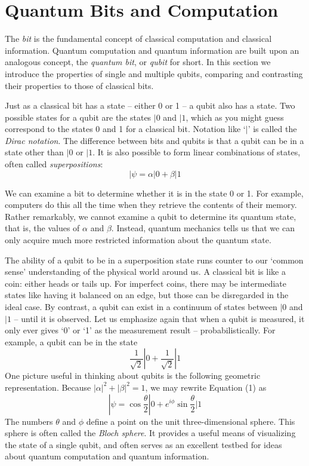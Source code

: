 \documentclass[20pt]{report}
\begin{document}
\part{Quantum Bits and Computation}
The \textit{bit} is the fundamental concept of classical computation and classical information.
Quantum computation and quantum information are built upon an analogous concept,
the \textit{quantum bit}, or \textit{qubit} for short. In this section we introduce the properties of single
and multiple qubits, comparing and contrasting their properties to those of classical bits.
\par
Just as a classical bit has a state – either 0 or 1 – a qubit also
has a state. Two possible states for a qubit are the states $|0$ and $|1$, which as you might
guess correspond to the states 0 and 1 for a classical bit. Notation like ‘$| $’ is called the
\textit{Dirac notation}.  The difference between bits and qubits is that a qubit can be in a
state other than $|0 $ or $|1 $. It is also possible to form linear combinations of states, often
called \textit{superpositions}: 
\begin{equation}
|\psi = \alpha|0 + \beta|1
\end{equation}
\par
We can examine a bit to determine whether it is in the state 0 or 1. For example,
computers do this all the time when they retrieve the contents of their memory. Rather
remarkably, we cannot examine a qubit to determine its quantum state, that is, the
values of $\alpha$ and $\beta$. Instead, quantum mechanics tells us that we can only acquire much more restricted information about the quantum state.
\par
The ability of a qubit to be in a superposition state runs counter to our ‘common sense’
understanding of the physical world around us. A classical bit is like a coin: either heads
or tails up. For imperfect coins, there may be intermediate states like having it balanced
on an edge, but those can be disregarded in the ideal case. By contrast, a qubit can exist
in a continuum of states between $|0 $ and $|1 $ – until it is observed. Let us emphasize
again that when a qubit is measured, it only ever gives ‘0’ or ‘1’ as the measurement
result – probabilistically. For example, a qubit can be in the state
\begin{equation}
\frac{1}{\sqrt{2}}|0 + \frac{1}{\sqrt{2}}|1
\end{equation}
One picture useful in thinking about qubits is the following geometric representation. Because $|\alpha|^2 + |\beta|^2 = 1$, we may rewrite Equation (1) as
\begin{equation}
|\psi = \cos{\frac{\theta}{2}}|0 + e^{i\phi} \sin{\frac{\theta}{2}}|1
\end{equation}
The numbers $\theta$ and $\phi$ define a point on the unit three-dimensional sphere. This sphere is often called the \textit{Bloch sphere}. It provides a useful means of visualizing the state of a single qubit, and often serves as an excellent testbed for ideas
about quantum computation and quantum information.


\printindex{}
\end{document}
